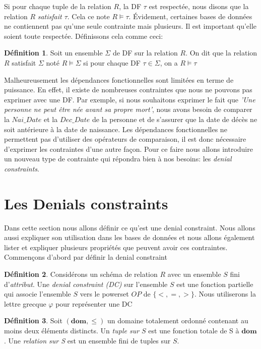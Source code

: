 \documentclass[letterpaper, 12pt]{report}
\theoremstyle{definition}
\newtheorem{mydef}{Définition}
\newcommand{\dom}{\mathbf{dom}}
\begin{document}
Si pour chaque tuple de la relation $R$, la DF $\tau$ est respectée, nous disons que la relation $R$ \emph{satisfait $\tau$}. Cela ce note $R \models \tau$. Évidement, certaines bases de données ne contiennent pas qu'une seule contrainte mais plusieurs. Il est important qu'elle soient toute respectée. Définissons cela comme ceci: 
  
\begin{mydef}
Soit un ensemble $\Sigma$ de DF sur la relation $R$. On dit que la relation $R$ satisfait $\Sigma$ noté $R \models \Sigma$ si pour chaque DF $ \tau \in \Sigma$, on a $R \models \tau$
\end{mydef}

Malheureusement les dépendances fonctionnelles sont limitées en terme de puissance. En effet, il existe de nombreuses contraintes que nous ne pouvons pas exprimer avec une DF. Par exemple, si nous souhaitons exprimer le fait que \emph{'Une personne ne peut être née avant sa propre mort'}, nous avons besoin de comparer la $Nai\_Date$ et la $Dec\_Date$ de la personne et de s'assurer que la date de décès ne soit antérieure à la date de naissance. Les dépendances fonctionnelles ne permettent pas d'utiliser des opérateurs de comparaison, il est donc nécessaire d'exprimer les contraintes d'une autre façon. Pour ce faire nous allons introduire un nouveau type de contrainte qui répondra bien à nos besoins: les \emph{denial constraints}.

\section{Les Denials constraints}

Dans cette section nous allons définir ce qu'est une denial constraint. Nous allons aussi expliquer son utilisation dans les bases de données et nous allons également lister et expliquer plusieurs propriétés que peuvent avoir ces contraintes. Commençons d'abord par définir la denial constraint

\begin{mydef}
Considérons un schéma de relation $R$ avec un ensemble $S$ fini d'\emph{attribut}. Une \emph{denial constraint (DC)} sur l'ensemble $S$ est une fonction partielle qui associe l'ensemble $S$ vers le powerset $OP$ de $\{ <,=,> \}$. Nous utiliserons la lettre grecque $\varphi$ pour représenter une DC
\end{mydef}

\begin{mydef}
 Soit $(\dom,\leq)$ un domaine totalement ordonné contenant au moins deux éléments distincts. Un \emph{tuple sur $S$} est une fonction totale de S à $\dom$. Une \emph{relation sur S} est un ensemble fini de tuples sur $S$. 
\end{mydef}
\end{document}
